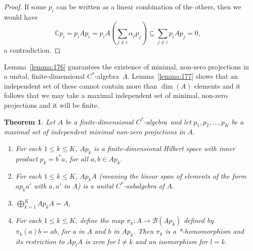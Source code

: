 \documentclass{book}
\newtheorem{theorem}[definition]{Theorem}
\def\cstar{\(C^*\)-algebra}
\begin{document}
\begin{proof}
  If some \(p_i\) can be written as a linear combination of the others, then
  we would have
  \[
    \mathbb{C}p_i = p_i Ap_i = p_i A(\sum_{j\neq i} \alpha_j p_j) \subseteq \sum_{j\neq i} p_i Ap_j = 0,
  \]
  a contradiction.
\end{proof}
Lemma~\ref{lemma:176} guarantees the existence of minimal, non-zero projections
in a unital, finite-dimensional \cstar\ \(A\). Lemma~\ref{lemma:177} shows that an
independent set of these cannot contain more than \(\dim(A)\) elements and it
follows that we may take a maximal independent set of minimal, non-zero
projections and it will be finite.
\begin{theorem}\label{theorem:178}
  Let \(A\) be a finite-dimensional \cstar\ and let
  \(p_1, p_2,\ldots,p_K\) be a maximal set of independent minimal non-zero projections
  in \(A\).
  \begin{enumerate}
    \item For each \(1 \leq k \leq K\), \(Ap_k\) is a finite-dimensional Hilbert space with
    inner product \(< a,b > p_k = b^*a\), for all \(a,b \in Ap_k\).
    \item For each \(1 \leq k \leq K\), \(Ap_k A\) (meaning the linear span of elements of
    the form \(ap_k a'\) with \(a,a'\) in \(A\)) is a unital \(C^*\)-subalgebra of \(A\).
    \item \(\bigoplus_{k=1}^K Ap_k A = A\),
    \item For each \(1 \leq k \leq K\), define the map \(\pi_k : A \rightarrow \mathcal{B}(Ap_k)\) defined by
    \(\pi_k(a)b = ab\), for a in \(A\) and \(b\) in \(Ap_k\). Then \(\pi_k\) is a *-homomorphism
    and its restriction to \(Ap_l A\) is zero for \(l\neq k\) and an isomorphism for
    \(l = k\).
  \end{enumerate}
\end{theorem}
\end{document}
